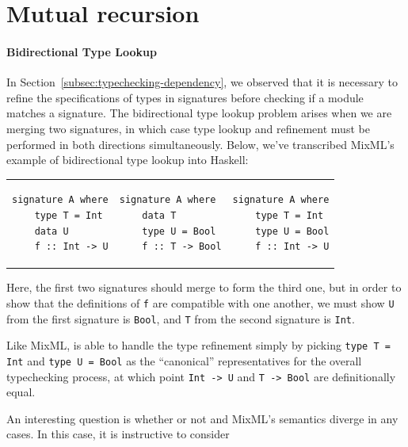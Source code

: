 \section{Mutual recursion}

\paragraph{Bidirectional Type Lookup}

In Section~\ref{subsec:typechecking-dependency}, we observed that
it is necessary to refine the specifications of types in signatures
before checking if a module matches a signature.  The bidirectional
type lookup problem arises when we are merging two signatures, in
which case type lookup and refinement must be performed in both
directions simultaneously.  Below, we've transcribed MixML's
example of bidirectional type lookup into Haskell:

\begin{tabular}{p{} p{} p{}}
\begin{verbatim}
signature A where
    type T = Int
    data U
    f :: Int -> U
\end{verbatim}
&
\begin{verbatim}
signature A where
    data T
    type U = Bool
    f :: T -> Bool
\end{verbatim}
&
\begin{verbatim}
signature A where
    type T = Int
    type U = Bool
    f :: Int -> U
\end{verbatim}
\end{tabular}

Here, the first two signatures should merge to form the third one,
but in order to show that the definitions of \verb|f| are compatible
with one another, we must show \verb|U| from the first signature is
\verb|Bool|, and \verb|T| from the second signature is \verb|Int|.

\noindent
Like MixML, \Backpack{} is able to handle the type refinement simply
by picking \verb|type T = Int| and \verb|type U = Bool| as the ``canonical''
representatives for the overall typechecking process, at which point
\verb|Int -> U| and \verb|T -> Bool| are definitionally equal.

An interesting question is whether or not \Backpack{} and MixML's semantics
diverge in any cases.  In this case, it is instructive to consider



